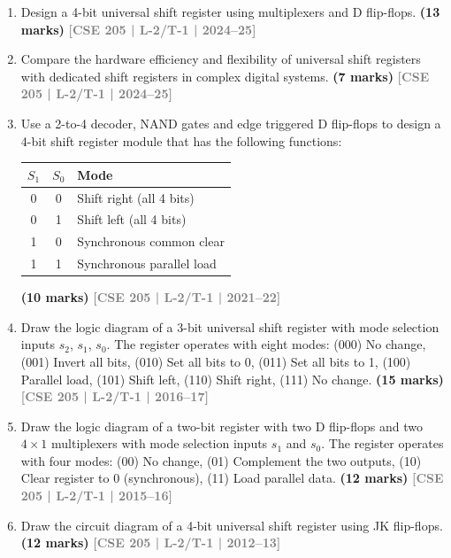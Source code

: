 \documentclass[12pt]{article}
\newcommand{\yr}[1]{\hfill\textcolor{gray}{\small\textbf{[#1]}}}
\newcommand{\mk}[1]{\textcolor{orange!70!black}{\small\textbf{(#1 marks)}}}
\begin{document}
\begin{enumerate}

\item Design a 4-bit universal shift register using multiplexers and D flip-flops.
\mk{13} \yr{CSE 205 | L-2/T-1 | 2024--25}

\item Compare the hardware efficiency and flexibility of universal shift registers with dedicated shift registers in complex digital systems.
\mk{7} \yr{CSE 205 | L-2/T-1 | 2024--25}

\item Use a 2-to-4 decoder, NAND gates and edge triggered D flip-flops to design a 4-bit shift register module that has the following functions:
\begin{center}
\begin{tabular}{|c|c|l|}
\hline
$S_1$ & $S_0$ & Mode \\
\hline
0 & 0 & Shift right (all 4 bits)\\
0 & 1 & Shift left (all 4 bits)\\
1 & 0 & Synchronous common clear \\
1 & 1 & Synchronous parallel load \\
\hline
\end{tabular}
\end{center}
\mk{10} \yr{CSE 205 | L-2/T-1 | 2021--22}

\item Draw the logic diagram of a 3-bit universal shift register with mode selection inputs $s_2$, $s_1$, $s_0$. The register operates with eight modes: (000) No change, (001) Invert all bits, (010) Set all bits to 0, (011) Set all bits to 1, (100) Parallel load, (101) Shift left, (110) Shift right, (111) No change.
\mk{15} \yr{CSE 205 | L-2/T-1 | 2016--17}

\item Draw the logic diagram of a two-bit register with two D flip-flops and two $4\times1$ multiplexers with mode selection inputs $s_1$ and $s_0$. The register operates with four modes: (00) No change, (01) Complement the two outputs, (10) Clear register to 0 (synchronous), (11) Load parallel data.
\mk{12} \yr{CSE 205 | L-2/T-1 | 2015--16}

\item Draw the circuit diagram of a 4-bit universal shift register using JK flip-flops.
\mk{12} \yr{CSE 205 | L-2/T-1 | 2012--13}

\end{enumerate}
\end{document}
